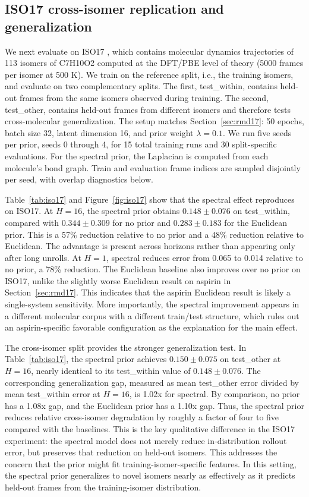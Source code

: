 \subsection{ISO17 cross-isomer replication and generalization}\label{sec:iso17}

We next evaluate on ISO17 \cite{schnet2017}, which contains molecular dynamics trajectories of 113 isomers of C7H10O2 computed at the DFT/PBE level of theory (5000 frames per isomer at 500 K). We train on the reference split, i.e., the training isomers, and evaluate on two complementary splits. The first, test\_within, contains held-out frames from the same isomers observed during training. The second, test\_other, contains held-out frames from different isomers and therefore tests cross-molecular generalization. The setup matches Section~\ref{sec:rmd17}: 50 epochs, batch size 32, latent dimension 16, and prior weight \(\lambda=0.1\). We run five seeds per prior, seeds 0 through 4, for 15 total training runs and 30 split-specific evaluations. For the spectral prior, the Laplacian is computed from each molecule's bond graph. Train and evaluation frame indices are sampled disjointly per seed, with overlap diagnostics below.

Table~\ref{tab:iso17} and Figure~\ref{fig:iso17} show that the spectral effect reproduces on ISO17. At \(H=16\), the spectral prior obtains \(0.148 \pm 0.076\) on test\_within, compared with \(0.344 \pm 0.309\) for no prior and \(0.283 \pm 0.183\) for the Euclidean prior. This is a 57\% reduction relative to no prior and a 48\% reduction relative to Euclidean. The advantage is present across horizons rather than appearing only after long unrolls. At \(H=1\), spectral reduces error from 0.065 to 0.014 relative to no prior, a 78\% reduction. The Euclidean baseline also improves over no prior on ISO17, unlike the slightly worse Euclidean result on aspirin in Section~\ref{sec:rmd17}. This indicates that the aspirin Euclidean result is likely a single-system sensitivity. More importantly, the spectral improvement appears in a different molecular corpus with a different train/test structure, which rules out an aspirin-specific favorable configuration as the explanation for the main effect.

The cross-isomer split provides the stronger generalization test. In Table~\ref{tab:iso17}, the spectral prior achieves \(0.150 \pm 0.075\) on test\_other at \(H=16\), nearly identical to its test\_within value of \(0.148 \pm 0.076\). The corresponding generalization gap, measured as mean test\_other error divided by mean test\_within error at \(H=16\), is 1.02x for spectral. By comparison, no prior has a 1.08x gap, and the Euclidean prior has a 1.10x gap. Thus, the spectral prior reduces relative cross-isomer degradation by roughly a factor of four to five compared with the baselines. This is the key qualitative difference in the ISO17 experiment: the spectral model does not merely reduce in-distribution rollout error, but preserves that reduction on held-out isomers. This addresses the concern that the prior might fit training-isomer-specific features. In this setting, the spectral prior generalizes to novel isomers nearly as effectively as it predicts held-out frames from the training-isomer distribution.

